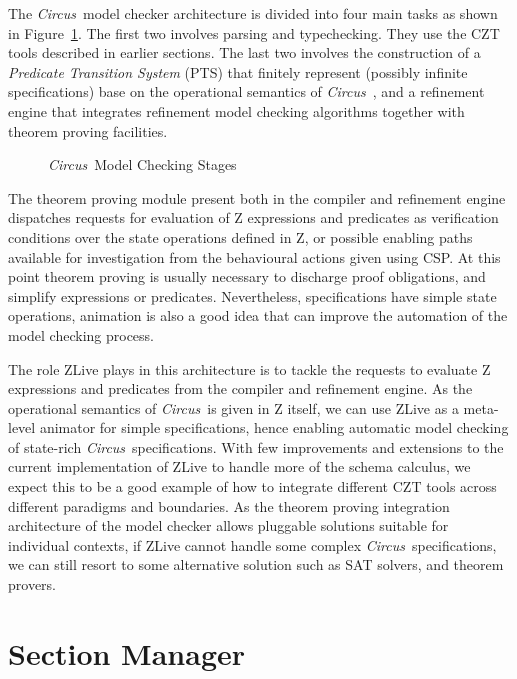 \documentclass{llncs}
\newcommand{\Circus}{{\sf\slshape Circus}}
\begin{document}
    The \Circus\ model checker architecture is divided into four main tasks as shown in Figure~\ref{mc-stages}.
    The first two involves parsing and typechecking. They use the CZT tools described in earlier
    sections. The last two involves the construction of a \textit{Predicate Transition System}
    (PTS) that finitely represent (possibly infinite specifications) base on the operational semantics
    of \Circus~\cite{circus.mc:opsem}, and a refinement engine that integrates refinement model checking
    algorithms together with theorem proving facilities.
    \begin{figure}[t]
    \begin{center}
    \end{center}    \caption{\Circus\ Model Checking Stages}\label{mc-stages}
    \end{figure}
    The theorem proving module present both in the compiler and refinement engine dispatches requests
    for evaluation of Z expressions and predicates as verification conditions over the state operations
    defined in Z, or possible enabling paths available for investigation from the behavioural actions
    given using CSP.
    At this point theorem proving is usually necessary to discharge proof obligations, and simplify
    expressions or predicates. Nevertheless, specifications have simple state operations, animation
    is also a good idea that can improve the automation of the model checking process.

    The role ZLive plays in this architecture is to tackle the requests to evaluate
    Z expressions and predicates from the compiler and refinement engine.
    As the operational semantics of \Circus\ is given in Z itself, we can use ZLive as a
    meta-level animator for simple specifications, hence enabling automatic model checking
    of state-rich \Circus\ specifications.
    With few improvements and extensions to the current implementation of ZLive to handle
    more of the schema calculus, we expect this to be a good example of how to integrate
    different CZT tools across different paradigms and boundaries.
    As the theorem proving integration architecture of the model checker allows pluggable
    solutions suitable for individual contexts, if ZLive cannot handle some complex \Circus\
    specifications, we can still resort to some alternative solution such as SAT solvers,
    and theorem provers.

\section{Section Manager}
\label{section-manager}
\end{document}

